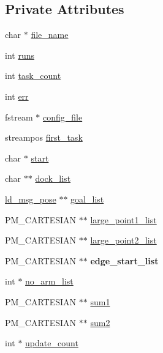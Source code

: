 \subsection*{Private Attributes}
\begin{DoxyCompactItemize}
\item 
char $\ast$ \mbox{\hyperlink{classcart__config_a3de41943f6230959d80159eb591cc9ef}{file\+\_\+name}}
\item 
int \mbox{\hyperlink{classcart__config_a7ad70584604bd971e639efb74a1552ec}{runs}}
\item 
int \mbox{\hyperlink{classcart__config_a54560028df17adebca7d034b3b246f45}{task\+\_\+count}}
\item 
int \mbox{\hyperlink{classcart__config_a5b331a578d28d3abec6625ac8952fe37}{err}}
\item 
fstream $\ast$ \mbox{\hyperlink{classcart__config_a471d3cd9fe8d8722e43194c55a45e976}{config\+\_\+file}}
\item 
streampos \mbox{\hyperlink{classcart__config_af683646edbe7260d8b12bc4fe4f885db}{first\+\_\+task}}
\item 
char $\ast$ \mbox{\hyperlink{classcart__config_a353c41c44acad0ec6620f92d01942e7f}{start}}
\item 
char $\ast$$\ast$ \mbox{\hyperlink{classcart__config_a3b73d8e5b48ba87502d77028ec765023}{dock\+\_\+list}}
\item 
\mbox{\hyperlink{structld__msg__pose}{ld\+\_\+msg\+\_\+pose}} $\ast$$\ast$ \mbox{\hyperlink{classcart__config_ac484fbaf3da5c3fcbf6b0b338ebf7812}{goal\+\_\+list}}
\item 
P\+M\+\_\+\+C\+A\+R\+T\+E\+S\+I\+AN $\ast$$\ast$ \mbox{\hyperlink{classcart__config_ae86eebedcace9bd7afabc6f264051ceb}{large\+\_\+point1\+\_\+list}}
\item 
P\+M\+\_\+\+C\+A\+R\+T\+E\+S\+I\+AN $\ast$$\ast$ \mbox{\hyperlink{classcart__config_a8f71e861e41c9f8fee2c05f2bad2d31e}{large\+\_\+point2\+\_\+list}}
\item 
\mbox{\label{classcart__config_ad48da65aaea1760122f798fb19d44453}} 
P\+M\+\_\+\+C\+A\+R\+T\+E\+S\+I\+AN $\ast$$\ast$ {\bfseries edge\+\_\+start\+\_\+list}
\item 
int $\ast$ \mbox{\hyperlink{classcart__config_a79325b64754bf4e6135d77234c85e2d8}{no\+\_\+arm\+\_\+list}}
\item 
P\+M\+\_\+\+C\+A\+R\+T\+E\+S\+I\+AN $\ast$$\ast$ \mbox{\hyperlink{classcart__config_a4bafa2b778c01f3648df8f24b24e59bb}{sum1}}
\item 
P\+M\+\_\+\+C\+A\+R\+T\+E\+S\+I\+AN $\ast$$\ast$ \mbox{\hyperlink{classcart__config_aa45f914752bd0cdfa4d7473be5d15a78}{sum2}}
\item 
int $\ast$ \mbox{\hyperlink{classcart__config_a68c64182da792f9eb4475705a228aae0}{update\+\_\+count}}
\end{DoxyCompactItemize}


